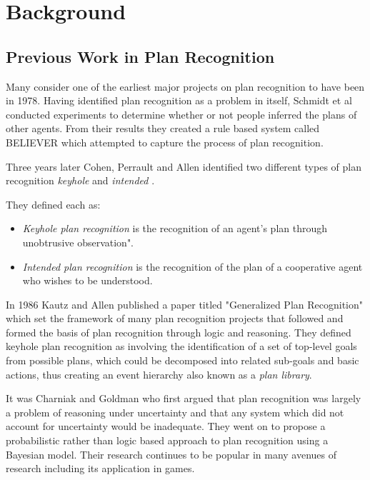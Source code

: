 \documentclass[parskip]{cs4rep}
\begin{document}
\chapter{Background}

\section{Previous Work in Plan Recognition}

Many consider one of the earliest major projects on plan recognition to have been in 1978. Having identified plan recognition as a problem in itself, Schmidt et al \cite{journals/ai/SchmidtSG78} conducted experiments to determine whether or not people inferred the plans of other agents. From their results they created a rule based system called BELIEVER which attempted to capture the process of plan recognition. 

Three years later Cohen, Perrault and Allen identified two different types of plan recognition \textit{keyhole} and \textit{intended} \cite{Cohen82a}. 

They defined each as:

\begin{itemize}
\item
\textit{Keyhole plan recognition} is the recognition of an agent's plan through unobtrusive observation".
\item
\textit{Intended plan recognition} is the recognition of the plan of a cooperative agent who wishes to be understood.
\newline
\end{itemize}

In 1986 Kautz and Allen published a paper titled "Generalized Plan Recognition" \cite{conf/aaai/KautzA86} which set the framework of many plan recognition projects that followed and formed the basis of plan recognition through logic and reasoning. They defined keyhole plan recognition as involving the identification of a set of top-level goals from possible plans, which could be decomposed into related sub-goals and basic actions, thus creating an event hierarchy also known as a \textit{plan library}. 

It was Charniak and Goldman \cite{journals/ai/CharniakG93} who first argued that plan recognition was largely a problem of reasoning under uncertainty and that any system which did not account for uncertainty would be inadequate. They went on to propose a probabilistic rather than logic based approach to  plan recognition using a Bayesian model. Their research continues to be popular in many avenues of research including its application in games.
\end{document}
